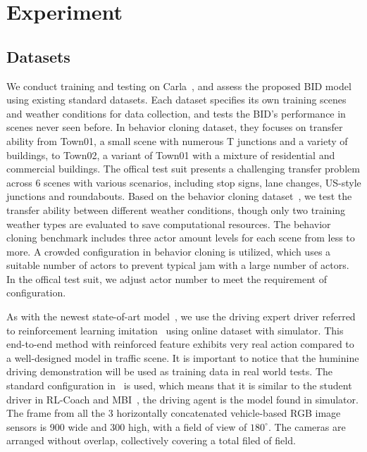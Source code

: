\section{Experiment}
%	

\subsection{Datasets} \label{sec:Dataset}

\hspace{1pc}We conduct training and testing on Carla~\cite{Dosovitskiy:2017},
and assess the proposed BID model using existing standard datasets\cite{codevilla2019exploring}. 
Each dataset specifies its own training scenes and weather conditions for data collection, 
and tests the BID's performance in scenes never seen before. 
In behavior cloning dataset\cite{codevilla2019exploring}, they focuses on transfer ability from Town01, a small scene with numerous T junctions and a variety of buildings, to Town02, a variant of Town01 with a mixture of residential and commercial buildings.
The offical test suit presents a challenging transfer problem across 6 scenes with various scenarios, including stop signs, lane changes, US-style junctions and roundabouts.
Based on the behavior cloning dataset~\cite{codevilla2019exploring}, we test the transfer ability between different weather conditions, though only two training weather types are evaluated to save computational resources. 
The behavior cloning benchmark includes three actor amount levels for each scene from less to more. 
A crowded configuration in behavior cloning is utilized, which uses a suitable number of actors to prevent typical jam with a large number of actors. 
In the offical test suit, we adjust actor number to meet the requirement of configuration. 


As with the newest state-of-art model~\cite{Hu:2022}, we use the driving expert driver referred to reinforcement learning imitation~\cite{Zhang:2021} using online dataset with simulator.
This end-to-end method with reinforced feature exhibits very real action compared to a well-designed model in traffic scene. 
It is important to notice that the huminine driving demonstration will be used as training data in real world tests.
The standard configuration in~\cite{Zhang:2021} is used, which means that it is similar to the student driver in RL-Coach\cite{Zhang:2021} and MBI~\cite{Hu:2022}, the driving agent is the model found in simulator.
The frame from all the 3 horizontally concatenated vehicle-based RGB image sensors is 900 wide and 300 high, with a field of view of $180^{\circ}$.
The cameras are arranged without overlap, collectively covering a total filed of field.


